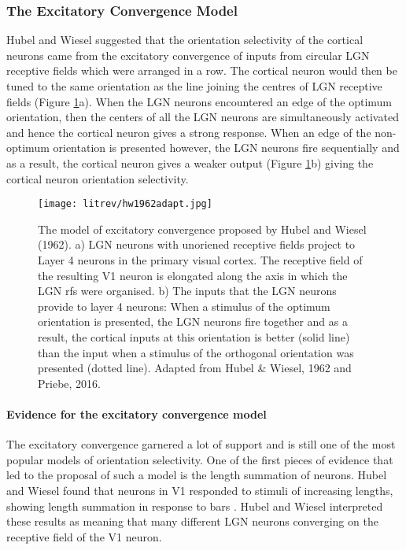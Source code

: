 \subsubsection{The Excitatory Convergence Model} Hubel and Wiesel suggested that the orientation selectivity of the cortical neurons came from the excitatory convergence of inputs from circular LGN receptive fields which were arranged in a row. The cortical neuron would then be tuned to the same orientation as the line joining the centres of LGN receptive fields (Figure \ref{fig:HW}a). When the LGN neurons encountered an edge of the optimum orientation, then the centers of all the LGN neurons are simultaneously activated and hence the cortical neuron gives a strong response. When an edge of the non-optimum orientation is presented however, the LGN neurons fire sequentially and as a result, the cortical neuron gives a weaker output (Figure \ref{fig:HW}b) giving the cortical neuron orientation selectivity.

	\begin{figure}[H]
	\centering
	\texttt{[image: litrev/hw1962adapt.jpg]}

	\caption{The model of excitatory convergence proposed by Hubel and Wiesel (1962). a) LGN neurons with unoriened receptive fields project to Layer 4 neurons in the primary visual cortex. The receptive field of the resulting V1 neuron is elongated along the axis in which the LGN rfs were organised. b) The inputs that the LGN neurons provide to layer 4 neurons: When a stimulus of the optimum orientation is presented, the LGN neurons fire together and as a result, the cortical inputs at this orientation is better (solid line) than the input when a stimulus of the orthogonal orientation was presented (dotted line). Adapted from Hubel \& Wiesel, 1962 and Priebe, 2016.}
	\label{fig:HW}
	\end{figure}

\paragraph{Evidence for the excitatory convergence model}

The excitatory convergence garnered a lot of support and is still one of the most popular models of orientation selectivity. One of the first pieces of evidence that led to the proposal of such a model is the length summation of neurons. Hubel and Wiesel found that neurons in V1 responded to stimuli of increasing lengths, showing length summation in response to bars \cite{Hubel1962d, Gilbert1977, Rose1977}. Hubel and Wiesel interpreted these results as meaning that many different LGN neurons converging on the receptive field of the V1 neuron. 

